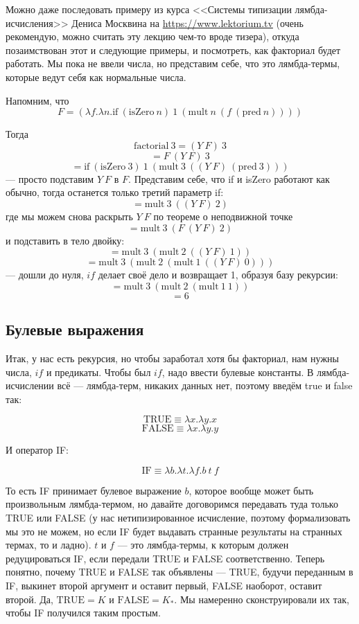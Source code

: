 \documentclass{../../text-style}
\begin{document}
Можно даже последовать примеру из курса <<Системы типизации лямбда-исчисления>> Дениса Москвина на \url{https://www.lektorium.tv} (очень рекомендую, можно считать эту лекцию чем-то вроде тизера), откуда позаимствован этот и следующие примеры, и посмотреть, как факториал будет работать. Мы пока не ввели числа, но представим себе, что это лямбда-термы, которые ведут себя как нормальные числа.

Напомним, что
$$F = (\lambda f.\lambda n.\mbox{if}\ (\mbox{isZero}\ n)\ 1\ (\mbox{mult}\ n\ (f\ (\mbox{pred}\ n))))$$

Тогда
$$\mbox{factorial}\ 3 = (Y\ F)\ 3$$
$$= F\ (Y\ F)\ 3$$
$$= \mbox{if}\ (\mbox{isZero}\ 3)\ 1\ (\mbox{mult}\ 3\ ((Y\ F)\ (\mbox{pred}\ 3)))$$
--- просто подставим $Y\ F$ в $F$. Представим себе, что if и isZero работают как обычно, тогда останется только третий параметр if:
$$= \mbox{mult}\ 3\ ((Y\ F)\ 2)$$
где мы можем снова раскрыть $Y\ F$ по теореме о неподвижной точке
$$= \mbox{mult}\ 3\ (F\ (Y\ F)\ 2)$$
и подставить в тело двойку:
$$= \mbox{mult}\ 3\ (\mbox{mult}\ 2\ ((Y\ F)\ 1))$$
$$= \mbox{mult}\ 3\ (\mbox{mult}\ 2\ (\mbox{mult}\ 1\ ((Y\ F)\ 0)))$$
--- дошли до нуля, $if$ делает своё дело и возвращает 1, образуя базу рекурсии:
$$= \mbox{mult}\ 3\ (\mbox{mult}\ 2\ (\mbox{mult}\ 1\ 1))$$
$$= 6$$

\subsection{Булевые выражения}

Итак, у нас есть рекурсия, но чтобы заработал хотя бы факториал, нам нужны числа, $if$ и предикаты. Чтобы был $if$, надо ввести булевые константы. В лямбда-исчислении всё --- лямбда-терм, никаких данных нет, поэтому введём true и false так:

$$\mbox{TRUE} \equiv \lambda x.\lambda y.x$$
$$\mbox{FALSE} \equiv \lambda x.\lambda y.y$$

И оператор IF: 

$$\mbox{IF} \equiv \lambda b.\lambda t.\lambda f.b\ t\ f$$

То есть IF принимает булевое выражение $b$, которое вообще может быть произвольным лямбда-термом, но давайте договоримся передавать туда только TRUE или FALSE (у нас нетипизированное исчисление, поэтому формализовать мы это не можем, но если IF будет выдавать странные результаты на странных термах, то и ладно). $t$ и $f$ --- это лямбда-термы, к которым должен редуцироваться IF, если передали TRUE и FALSE соответственно. Теперь понятно, почему TRUE и FALSE так объявлены --- TRUE, будучи переданным в IF, выкинет второй аргумент и оставит первый, FALSE наоборот, оставит второй. Да, $\mbox{TRUE} = K$ и $\mbox{FALSE} = K_\ast$. Мы намеренно сконструировали их так, чтобы IF получился таким простым.
\end{document}
